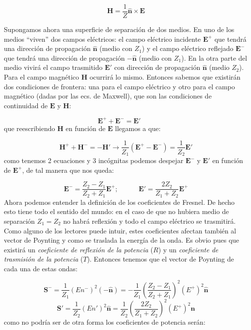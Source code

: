 \documentclass[12pt,a4paper]{article}
\newcommand{\parentesis}[1]{\left( #1  \right)}
\newcommand{\tquad}{\quad \quad \quad}
\newcommand{\En}{\mathbf{E}}
\newcommand{\Hn}{\mathbf{H}}
\newcommand{\Sn}{\mathbf{S}}
\newcommand{\hnn}{\hat{\mathbf{n}}}
\numberwithin{equation}{section}
\numberwithin{figure}{section}
\begin{document}
\begin{equation}
\Hn = \dfrac{1}{Z} \hnn \times \En
\end{equation}

Supongamos ahora una superficie de separación de dos medios. En uno de los medios  ``viven'' dos campos eléctricos: el campo eléctrico incidente $\En^+$ que tendrá una dirección de propagación $\hnn$ (medio con $Z_1$) y el campo eléctrico reflejado $\En^-$ que tendrá una dirección de propagación $-\hnn$ (medio con $Z_1$). En la otra parte del medio vivirá el campo trasmitido $\En'$ con dirección de propagación $\hnn$ (medio $Z_2$). Para el campo magnético $\Hn$ ocurrirá lo mismo. Entonces sabemos que existirán dos condiciones de frontera: una para el campo eléctrico y otro para el campo magnético (dadas por las ecs. de Maxwell), que son las condiciones de continuidad de $\En$ y $\Hn$:

\begin{equation}
\En^+ + \En^-  = \En ' \quad \quad 
\end{equation}
que reescribiendo $\Hn$ en función de $\En$ llegamos a que:

\begin{equation}
\Hn^+ + \Hn^- = - \Hn '  \longrightarrow \dfrac{1}{Z_1} (\En^+ - \En^-) = \dfrac{1}{Z_2} \En'
\end{equation}
como tenemos 2 ecuaciones y 3 incógnitas podemos despejar $\En^-$ y $\En'$ en función de $\En^+$, de tal manera que nos queda:

\begin{equation}
\En^- = \dfrac{Z_2 - Z_1}{Z_2 + Z_1} \En^+; \tquad  \En' = \dfrac{2Z_2}{Z_1 + Z_2} \En^+ 
\end{equation}
Ahora podemos entender la definición de los coeficientes de Fresnel. De hecho esto tiene todo el sentido del mundo: en el caso de que no hubiera medio de separación $Z_1 = Z_2$ no habrá reflexión y todo el campo eléctrico se trasmitirá. \\

Como alguno de los lectores puede intuir, estes coeficientes afectan también al vector de Poynting y como se traslada la energía de la onda. Es obvio pues que existirá un \textit{coeficiente de reflexión de la potencia} ($R$) y un \textit{coeficiente de trasmisión de la potencia} ($T$). Entonces tenemos que el vector de Poynting de cada una de estas ondas:

\begin{equation}
\Sn^- = \dfrac{1}{Z_1} (En^-)^2 (- \hnn) = - \dfrac{1}{Z_1} \parentesis{\dfrac{Z_2 - Z_1}{Z_2 + Z_1} }^2 (E^+)^2 \hnn
\end{equation}
\begin{equation}
\Sn' = \dfrac{1}{Z_2} (En')^2 \hnn = \dfrac{1}{Z_2} \parentesis{\dfrac{2Z_2}{Z_1 + Z_2}}^2 (E^+)^2 \hnn
\end{equation}
como no podría ser de otra forma los coeficientes de potencia serán:
\end{document}

